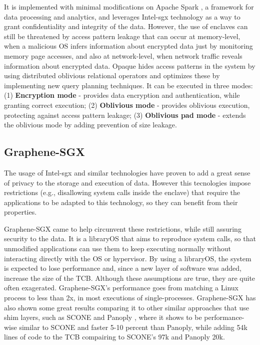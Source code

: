 It is implemented with minimal modifications on Apache Spark \cite{apacheSparkPaper}, a framework for data processing and analytics, and leverages Intel-\gls{sgx} technology as a way to grant confidentiality and integrity of the data. 
However, the use of enclaves can still be threatened by access pattern leakage that can occur at memory-level, when a malicious OS infers information about encrypted data just by monitoring memory page accesses, and also at network-level, when network traffic reveals information about encrypted data.
Opaque hides access patterns in the system by using distributed oblivious relational operators and optimizes these by implementing new query planning techniques. It can be executed in three modes: 
(1) \textbf{Encryption mode} - provides data encryption and authentication, while granting correct execution;
(2) \textbf{Oblivious mode} - provides oblivious execution, protecting against access pattern leakage;
(3) \textbf{Oblivious pad mode} - extends the oblivious mode by adding prevention of size leakage.


\subsection{Graphene-SGX}
\label{ssec:grapheneSGX}

The usage of Intel-\gls{sgx} and similar technologies have proven to add a great sense of privacy to the storage and execution of data. However this tecnologies impose restrictions (e.g., disallowing system calls inside the enclave) that require the applications to be  adapted to this technology, so they can benefit from their properties. 

Graphene-SGX \cite{graphenePaper} came to help circunvent these restrictions, while still assuring security to the data. It is a libraryOS that aims to reproduce system calls, so that unmodified applications can use them to keep executing normally without interacting directly with the OS or hypervisor. 
By using a libraryOS, the system is expected to lose performance and, since a new layer of software was added, increase the size of the TCB. 
Although these assumptions are true, they are quite often exagerated. Graphene-SGX's performance goes from matching a Linux process to less than 2x, in most executions of single-processes.
Graphene-SGX has also shown some great results comparing it to other similar approaches that use shim layers, such as SCONE \cite{sconePaper} and Panoply \cite{panoplyPaper}, where it shows to be performance-wise similar to SCONE and faster 5-10 percent than Panoply, while adding 54k lines of code to the TCB compairing to SCONE's 97k and Panoply 20k.

